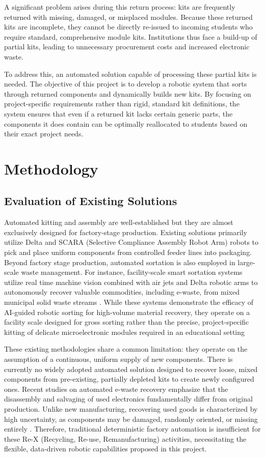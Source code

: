 \documentclass[conference]{IEEEtran}
\begin{document}
A significant problem arises during this return process: kits are frequently returned with missing, damaged, or misplaced modules. Because these returned kits are incomplete, they cannot be directly re-issued to incoming students who require standard, comprehensive module kits. Institutions thus face a build-up of partial kits, leading to unnecessary procurement costs and increased electronic waste.

To address this, an automated solution capable of processing these partial kits is needed. The objective of this project is to develop a robotic system that sorts through returned components and dynamically builds new kits. By focusing on project-specific requirements rather than rigid, standard kit definitions, the system ensures that even if a returned kit lacks certain generic parts, the components it does contain can be optimally reallocated to students based on their exact project needs.

\section{Methodology}
\subsection{Evaluation of Existing Solutions}
Automated kitting and assembly are well-established but they are almost exclusively designed for factory-stage production. Existing solutions primarily utilize Delta and SCARA (Selective Compliance Assembly Robot Arm) robots to pick and place uniform components from controlled feeder lines into packaging. Beyond factory stage production, automated sortation is also employed in large-scale waste management. For instance, facility-scale smart sortation systems utilize real time machine vision combined with air jets and Delta robotic arms to autonomously recover valuable commodities, including e-waste, from mixed municipal solid waste streams \cite{amp}. While these systems demonstrate the efficacy of AI-guided robotic sorting for high-volume material recovery, they operate on a facility scale designed for gross sorting rather than the precise, project-specific kitting of delicate microelectronic modules required in an educational setting

These existing methodologies share a common limitation: they operate on the assumption of a continuous, uniform supply of new components. There is currently no widely adopted automated solution designed to recover loose, mixed components from pre-existing, partially depleted kits to create newly configured ones. Recent studies on automated e-waste recovery emphasize that the disassembly and salvaging of used electronics fundamentally differ from original production. Unlike new manufacturing, recovering used goods is characterized by high uncertainty, as components may be damaged, randomly oriented, or missing entirely \cite{saenz}. Therefore, traditional deterministic factory automation is insufficient for these Re-X (Recycling, Re-use, Remanufacturing) activities, necessitating the flexible, data-driven robotic capabilities proposed in this project.
\end{document}
